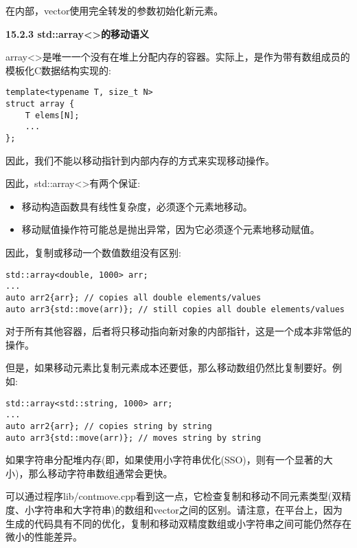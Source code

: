 在内部，vector使用完全转发的参数初始化新元素。\par

\hspace*{\fill} \par %
\textbf{15.2.3 std::array<>的移动语义}

array<>是唯一一个没有在堆上分配内存的容器。实际上，是作为带有数组成员的模板化C数据结构实现的:\par

\begin{lstlisting}[caption={}]
template<typename T, size_t N>
struct array {
	T elems[N];
	...
};
\end{lstlisting}

因此，我们不能以移动指针到内部内存的方式来实现移动操作。\par

因此，std::array<>有两个保证:\par

\begin{itemize}
	\item 移动构造函数具有线性复杂度，必须逐个元素地移动。
	\item 移动赋值操作符可能总是抛出异常，因为它必须逐个元素地移动赋值。
\end{itemize}

因此，复制或移动一个数值数组没有区别:\par

\begin{lstlisting}[caption={}]
std::array<double, 1000> arr;
...
auto arr2{arr}; // copies all double elements/values
auto arr3{std::move(arr)}; // still copies all double elements/values
\end{lstlisting}

对于所有其他容器，后者将只移动指向新对象的内部指针，这是一个成本非常低的操作。\par

但是，如果移动元素比复制元素成本还要低，那么移动数组仍然比复制要好。例如:\par

\begin{lstlisting}[caption={}]
std::array<std::string, 1000> arr;
...
auto arr2{arr}; // copies string by string
auto arr3{std::move(arr)}; // moves string by string
\end{lstlisting}

如果字符串分配堆内存(即，如果使用小字符串优化(SSO)，则有一个显著的大小)，那么移动字符串数组通常会更快。\par

可以通过程序lib/contmove.cpp看到这一点，它检查复制和移动不同元素类型(双精度、小字符串和大字符串)的数组和vector之间的区别。请注意，在平台上，因为生成的代码具有不同的优化，复制和移动双精度数组或小字符串之间可能仍然存在微小的性能差异。\par





















